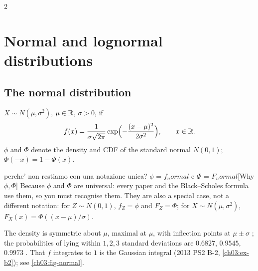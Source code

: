 \begin{paracol}{2}
\section{Normal and lognormal distributions}\label{ch03:sec-normal}

\subsection{The normal distribution}
\begin{definition}
$X\sim N(\mu,\sigma^2)$, $\mu\in\mathbb{R}$, $\sigma>0$, if
\[
  f(x)=\frac{1}{\sigma\sqrt{2\pi}}\exp\Bigl(-\frac{(x-\mu)^2}{2\sigma^2}\Bigr),\qquad x\in\mathbb{R} .
\]
$\phi$ and $\Phi$ denote the density and CDF of the standard normal $N(0,1)$; $\Phi(-x)=1-\Phi(x)$.\begin{answer}{perche' non restiamo con una notazione unica? $\phi$ = $f_normal$ e $\Phi$ = $F_normal$}[Why $\phi,\Phi$]
Because $\phi$ and $\Phi$ are universal: every paper and the Black--Scholes formula use them, so you must
recognise them. They are also a special case, not a different notation: for $Z\sim N(0,1)$, $f_Z=\phi$
and $F_Z=\Phi$; for $X\sim N(\mu,\sigma^2)$, $F_X(x)=\Phi((x-\mu)/\sigma)$.
\end{answer}
\end{definition}
The density is symmetric about $\mu$, maximal at $\mu$, with inflection points at $\mu\pm\sigma$
; the probabilities of lying within $1,2,3$ standard deviations are
$0.6827$, $0.9545$, $0.9973$ . That $f$ integrates to $1$ is the Gaussian integral
(2013 PS2 B-2, \cref{ch03:ex-b2}); see \cref{ch03:fig-normal}.


\end{paracol}
